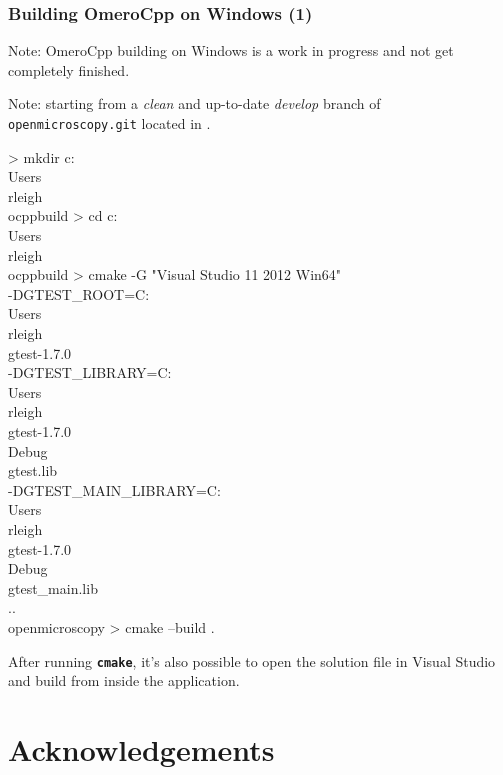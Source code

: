 \documentclass{beamer}
\newcommand{\cmd}[1]{\textbf{\texttt{#1}}}
\newcommand{\pkg}[1]{\texttt{#1}}
\begin{document}
\begin{frame}[fragile]
  \frametitle{Building OmeroCpp on Windows (1)}
  \scriptsize

  Note: OmeroCpp building on Windows is a work in progress and not get
  completely finished.

  \bigskip
  Note: starting from a \emph{clean} and up-to-date \emph{develop}
  branch of \pkg{openmicroscopy.git} located in
  .

  \begin{semiverbatim}
> mkdir c:\\Users\\rleigh\\ocppbuild
> cd c:\\Users\\rleigh\\ocppbuild
> cmake -G "Visual Studio 11 2012 Win64" \\
  -DGTEST_ROOT=C:\\Users\\rleigh\\gtest-1.7.0 \\
  -DGTEST_LIBRARY=C:\\Users\\rleigh\\gtest-1.7.0\\Debug\\gtest.lib \\
  -DGTEST_MAIN_LIBRARY=C:\\Users\\rleigh\\gtest-1.7.0\\Debug\\gtest_main.lib \\
  ..\\openmicroscopy
> cmake --build .
\end{semiverbatim}

After running \cmd{cmake}, it's also possible to open the solution
file in Visual Studio and build from inside the application.
\end{frame}

\appendix
\section[]{Acknowledgements}
\end{document}
